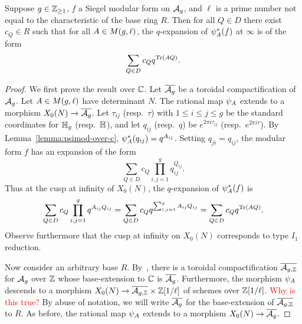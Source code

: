 \documentclass{amsart}
\begin{document}
\begin{lemma}\label{lemma:q-expansion}
  Suppose  $g \in \mathbb{Z}_{\ge 1}$, $f$ a Siegel modular form on $\mathcal{A}_g$, and $\ell$ is a prime number not equal to the characteristic of the base ring $R$. 
  Then for all $Q\in D$ there exist $c_Q \in R$ such that for all $A \in M(g,\ell)$, the $q$-expansion of 
  $\psi_{A}^*(f)$ at $\infty$ is of the form
  \[
    \sum_{Q \in D} c_Q q^{\operatorname{Tr}(AQ)}.
  \]
\end{lemma}

\begin{proof}
  We first prove the result over $\mathbb{C}$. Let $\overline{\mathcal{A}_g}$ be a toroidal compactification of $\mathcal{A}_g$. Let $A \in M(g,\ell)$ have determinant $N$. The rational map $\psi_{A}$ extends to a morphism $X_0(N) \to \overline{\mathcal{A}_g}$. Let $\tau_{ij}$ (resp.~$\tau$) with $1 \leq i \leq j \leq g$ be the standard coordinates for $\mathbb{H}_g$ (resp.~$\mathbb{H}$), and let $q_{ij}$ (resp.~$q$) be $e^{2\pi i \tau_{ij}}$ (resp.~$e^{2\pi i \tau}$). By Lemma~\ref{lemma:psimod-over-c}, $\psi_{A}^*(q_{ij}) = q^{A_{ij}}$. Setting $q_{ji} = q_{ij}$, the modular form $f$ has an expansion of the form
    \[
      \sum_{Q \in D} c_Q \prod_{i,j=1}^g q_{ij}^{Q_{ij}}.
    \]
    Thus at the cusp at infinity of $X_0(N)$, the $q$-expansion of $\psi_{A}^*(f)$ is
    $$\sum_{Q \in D} c_Q \prod_{i,j=1}^g q^{A_{ij}Q_{ij}} = \sum_{Q \in D} c_Q q^{\sum_{i,j=1}^g A_{ij}Q_{ij}} 
    = \sum_{Q \in D} c_Q q^{\operatorname{Tr}(AQ)}.$$
  Observe furthermore that the cusp at infinity on $X_0(N)$ corresponds to type $I_1$ reduction. %

  Now consider an arbitrary base $R$. By~\cite[IV.5.15]{faltings1990degeneration}, there is a toroidal compactification $\overline{\mathcal{A}_{g,\mathbb{Z}}}$ for $\mathcal{A}_g$ over $\mathbb{Z}$ whose base-extension to $\mathbb{C}$ is $\overline{\mathcal{A}_g}$. Furthermore, the morphism $\psi_{A}$ descends to a morphism $X_0(N) \to \overline{\mathcal{A}_{g,\mathbb{Z}}} \times \mathbb{Z}[1/\ell]$ of schemes over $\mathbb{Z}[1/\ell]$. \textcolor{red}{Why is this true?} By abuse of notation, we will write $\overline{\mathcal{A}_g}$ for the base-extension of $\overline{\mathcal{A}_{g,\mathbb{Z}}}$ to $R$. As before, the rational map $\psi_{A}$ extends to a morphism $X_0(N) \to \overline{\mathcal{A}_g}$.
  

\end{proof}
\end{document}
